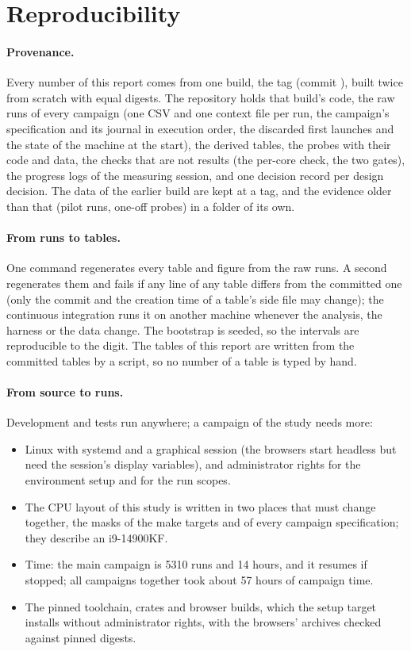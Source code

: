 \section{Reproducibility}
\label{sec:reproducibility}

\paragraph{Provenance.} Every number of this report comes from one build,
the tag  (commit ), built twice from
scratch with equal digests. The repository holds that build's code, the raw
runs of every campaign (one CSV and one context file per run, the campaign's
specification and its journal in execution order, the discarded first
launches and the state of the machine at the start), the derived tables,
the probes with their code and data, the checks that are not results (the
per-core check, the two gates), the progress logs of the measuring session,
and one decision record per design decision. The data of the earlier build
are kept at a tag, and the evidence older than that (pilot runs, one-off
probes) in a folder of its own.

\paragraph{From runs to tables.} One command regenerates every table and
figure from the raw runs. A second regenerates them and fails if any line
of any table differs from the committed one (only the commit and the
creation time of a table's side file may change); the continuous
integration runs it on another machine whenever the analysis, the harness
or the data change. The bootstrap is seeded, so the intervals are
reproducible to the digit. The tables of this report are written from the
committed tables by a script, so no number of a table is typed by hand.

\paragraph{From source to runs.} Development and tests run anywhere; a
campaign of the study needs more:
\begin{itemize}[leftmargin=1.5em]
\item Linux with systemd and a graphical session (the browsers start
headless but need the session's display variables), and administrator
rights for the environment setup and for the run scopes.
\item The CPU layout of this study is written in two places that must
change together, the masks of the make targets and of every campaign
specification; they describe an i9-14900KF.
\item Time: the main campaign is 5310 runs and 14 hours, and it resumes if
stopped; all campaigns together took about 57 hours of campaign time.
\item The pinned toolchain, crates and browser builds, which the setup
target installs without administrator rights, with the browsers' archives
checked against pinned digests.
\end{itemize}

